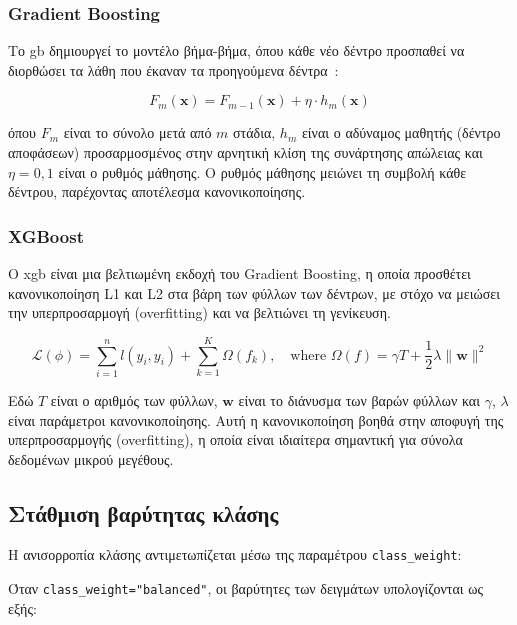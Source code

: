 \subsubsection{Gradient Boosting}

Το \gls{gb} δημιουργεί το μοντέλο βήμα-βήμα, όπου κάθε νέο δέντρο προσπαθεί να διορθώσει τα λάθη που έκαναν τα προηγούμενα δέντρα~\cite{friedman2001greedy}:

\begin{equation}
F_m(\mathbf{x}) = F_{m-1}(\mathbf{x}) + \eta \cdot h_m(\mathbf{x})
\label{eq:gradient-boosting}
\end{equation}

όπου $F_m$ είναι το σύνολο μετά από $m$ στάδια, $h_m$ είναι ο αδύναμος μαθητής (δέντρο αποφάσεων) προσαρμοσμένος στην αρνητική κλίση της συνάρτησης απώλειας και $\eta = 0{,}1$ είναι ο ρυθμός μάθησης. Ο ρυθμός μάθησης μειώνει τη συμβολή κάθε δέντρου, παρέχοντας αποτέλεσμα κανονικοποίησης.

\subsubsection{XGBoost}

O \gls{xgb} \cite{chen2016xgboost} είναι μια βελτιωμένη εκδοχή του Gradient Boosting, η οποία προσθέτει κανονικοποίηση L1 και L2 στα βάρη των φύλλων των δέντρων, με στόχο να μειώσει την υπερπροσαρμογή (\gls{overfitting}) και να βελτιώνει τη γενίκευση.

\begin{equation}
\mathcal{L}(\phi) = \sum_{i=1}^{n} l(\hat{y}_i, y_i) + \sum_{k=1}^{K} \Omega(f_k), \quad \text{where } \Omega(f) = \gamma T + \frac{1}{2}\lambda \|\mathbf{w}\|^2
\label{eq:xgboost}
\end{equation}

Εδώ $T$ είναι ο αριθμός των φύλλων, $\mathbf{w}$ είναι το διάνυσμα των βαρών φύλλων και $\gamma$, $\lambda$ είναι παράμετροι κανονικοποίησης. Αυτή η κανονικοποίηση βοηθά στην αποφυγή της υπερπροσαρμογής (\gls{overfitting}), η οποία είναι ιδιαίτερα σημαντική για σύνολα δεδομένων μικρού μεγέθους.

\subsection{Στάθμιση βαρύτητας κλάσης}

Η ανισορροπία κλάσης αντιμετωπίζεται μέσω της παραμέτρου \texttt{class\_weight}:

Όταν \texttt{class\_weight="balanced"}, οι βαρύτητες των δειγμάτων υπολογίζονται ως εξής:

